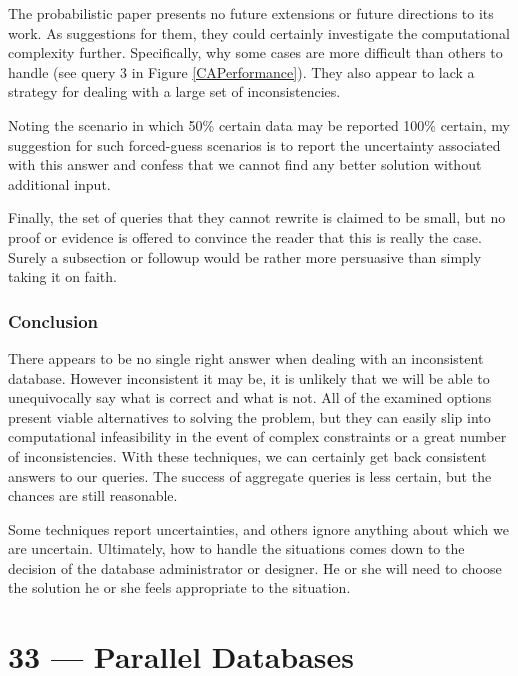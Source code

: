 \documentclass[a4paper]{report}
\begin{document}
The probabilistic paper presents no future extensions or future directions to its work. As suggestions for them, they could certainly investigate the computational complexity further. Specifically, why some cases are more difficult than others to handle (see query 3 in Figure \ref{CAPerformance}). They also appear to lack a strategy for dealing with a large set of inconsistencies. 

Noting the scenario in which 50\% certain data may be reported 100\% certain, my suggestion for such forced-guess scenarios is to report the uncertainty associated with this answer and confess that we cannot find any better solution without additional input.

Finally, the set of queries that they cannot rewrite is claimed to be small, but no proof or evidence is offered to convince the reader that this is really the case. Surely a subsection or followup would be rather more persuasive than simply taking it on faith.

\subsection*{Conclusion}

There appears to be no single right answer when dealing with an inconsistent database. However inconsistent it may be, it is unlikely that we will be able to unequivocally say what is correct and what is not. All of the examined options present viable alternatives to solving the problem, but they can easily slip into computational infeasibility in the event of complex constraints or a great number of inconsistencies. With these techniques, we can certainly get back consistent answers to our queries. The success of aggregate queries is less certain, but the chances are still reasonable.

Some techniques report uncertainties, and others ignore anything about which we are uncertain. Ultimately, how to handle the situations comes down to the decision of the database administrator or designer. He or she will need to choose the solution he or she feels appropriate to the situation. 











\chapter*{33 --- Parallel Databases}
\end{document}

